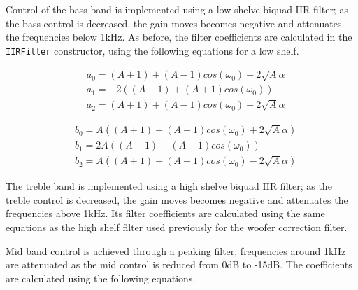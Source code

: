 \documentclass[main.tex]{subfiles}
\begin{document}
\medskip
Control of the bass band is implemented using a low shelve biquad IIR filter; as the bass control is decreased, the gain moves becomes negative and attenuates the frequencies below 1kHz.
As before, the filter coefficients are calculated in the \lstinline{IIRFilter} constructor, using the following equations for a low shelf.

\begin{center}
    \begin{minipage}{.5\linewidth}
        \begin{equation*}
            \begin{aligned} 
                &a_0 = (A + 1) + (A - 1)cos(\omega_ 0) + 2\sqrt{A} \alpha \\
                &a_1 = -2((A - 1) + (A + 1)cos(\omega_ 0)) \\
                &a_2 = (A + 1) + (A - 1)cos(\omega_ 0) - 2\sqrt{A} \alpha
            \end{aligned}
        \end{equation*}
        \end{minipage}%
        \begin{minipage}{.5\linewidth}
        \begin{equation}
            \begin{aligned}
                &b_0 = A((A + 1) - (A - 1)cos(\omega _0) + 2\sqrt{A} \alpha) \\
                &b_1 = 2A((A - 1) - (A + 1)cos(\omega _0)) \\
                &b_2 = A((A + 1) - (A - 1)cos(\omega_ 0) - 2\sqrt{A} \alpha)
            \end{aligned}
        \end{equation}
    \end{minipage}
\end{center}

The treble band is implemented using a high shelve biquad IIR filter; as the treble control is decreased, the gain moves becomes negative and attenuates the frequencies above 1kHz.
Its filter coefficients are calculated using the same equations as the high shelf filter used previously for the woofer correction filter.

\medskip
Mid band control is achieved through a peaking filter, frequencies around 1kHz are attenuated as the mid control is reduced from 0dB to -15dB.
The coefficients are calculated using the following equations.
\end{document}
